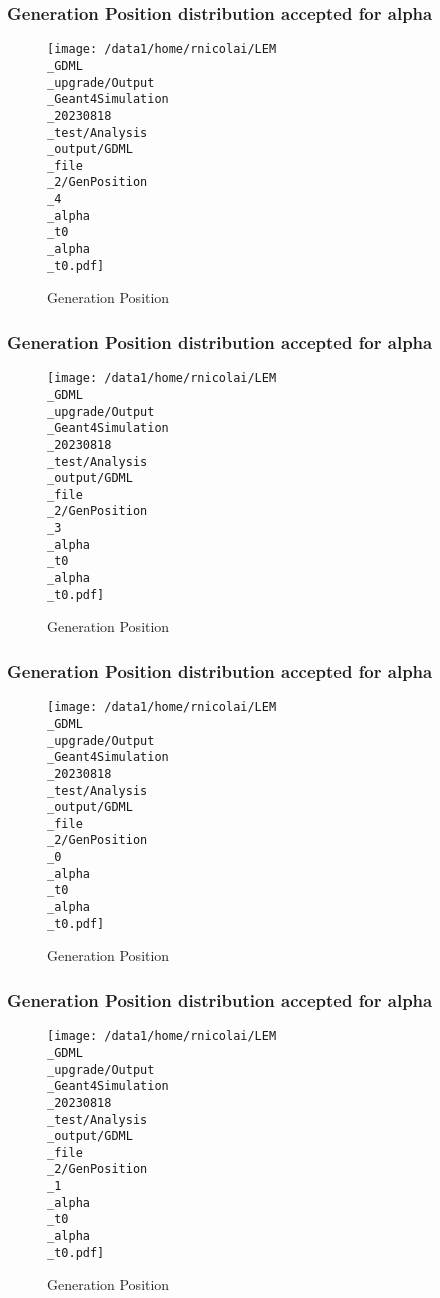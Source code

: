 \documentclass[8pt]{beamer}
\begin{document}
            \begin{frame}
                \frametitle{Generation Position distribution accepted for alpha}
            
        \begin{figure}[h]
            \centering
            \texttt{[image: /data1/home/rnicolai/LEM\\\_GDML\\\_upgrade/Output\\\_Geant4Simulation\\\_20230818\\\_test/Analysis\\\_output/GDML\\\_file\\\_2/GenPosition\\\_4\\\_alpha\\\_t0\\\_alpha\\\_t0.pdf]}
            \caption{Generation Position}
        \end{figure}
        
            \end{frame}
            
            \begin{frame}
                \frametitle{Generation Position distribution accepted for alpha}
            
        \begin{figure}[h]
            \centering
            \texttt{[image: /data1/home/rnicolai/LEM\\\_GDML\\\_upgrade/Output\\\_Geant4Simulation\\\_20230818\\\_test/Analysis\\\_output/GDML\\\_file\\\_2/GenPosition\\\_3\\\_alpha\\\_t0\\\_alpha\\\_t0.pdf]}
            \caption{Generation Position}
        \end{figure}
        
            \end{frame}
            
            \begin{frame}
                \frametitle{Generation Position distribution accepted for alpha}
            
        \begin{figure}[h]
            \centering
            \texttt{[image: /data1/home/rnicolai/LEM\\\_GDML\\\_upgrade/Output\\\_Geant4Simulation\\\_20230818\\\_test/Analysis\\\_output/GDML\\\_file\\\_2/GenPosition\\\_0\\\_alpha\\\_t0\\\_alpha\\\_t0.pdf]}
            \caption{Generation Position}
        \end{figure}
        
            \end{frame}
            
            \begin{frame}
                \frametitle{Generation Position distribution accepted for alpha}
            
        \begin{figure}[h]
            \centering
            \texttt{[image: /data1/home/rnicolai/LEM\\\_GDML\\\_upgrade/Output\\\_Geant4Simulation\\\_20230818\\\_test/Analysis\\\_output/GDML\\\_file\\\_2/GenPosition\\\_1\\\_alpha\\\_t0\\\_alpha\\\_t0.pdf]}
            \caption{Generation Position}
        \end{figure}
        
            \end{frame}
            
\end{document}
